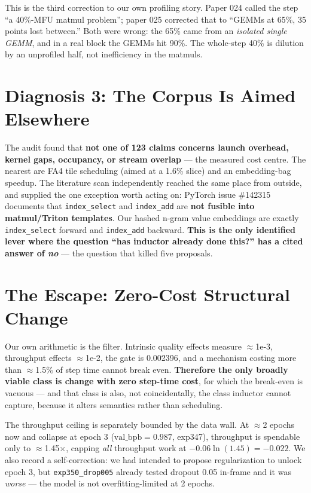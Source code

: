 \documentclass{article}
\newcommand{\vb}{\mathrm{val\_bpb}}
\begin{document}
This is the third correction to our own profiling story. Paper 024 called the step ``a 40\%-MFU matmul problem''; paper 025 corrected that to ``GEMMs at 65\%, 35 points lost between.'' Both were wrong: the 65\% came from an \emph{isolated single GEMM}, and in a real block the GEMMs hit 90\%. The whole-step 40\% is dilution by an unprofiled half, not inefficiency in the matmuls.

\section{Diagnosis 3: The Corpus Is Aimed Elsewhere}
The audit found that \textbf{not one of 123 claims concerns launch overhead, kernel gaps, occupancy, or stream overlap} --- the measured cost centre. The nearest are FA4 tile scheduling (aimed at a 1.6\% slice) and an embedding-bag speedup. The literature scan independently reached the same place from outside, and supplied the one exception worth acting on: PyTorch issue \#142315 documents that \texttt{index\_select} and \texttt{index\_add} are \textbf{not fusible into matmul/Triton templates}. Our hashed n-gram value embeddings are exactly \texttt{index\_select} forward and \texttt{index\_add} backward. \textbf{This is the only identified lever where the question ``has inductor already done this?'' has a cited answer of \emph{no}} --- the question that killed five proposals.

\section{The Escape: Zero-Cost Structural Change}
Our own arithmetic is the filter. Intrinsic quality effects measure $\approx$1e-3, throughput effects $\approx$1e-2, the gate is 0.002396, and a mechanism costing more than $\approx$1.5\% of step time cannot break even. \textbf{Therefore the only broadly viable class is change with zero step-time cost}, for which the break-even is vacuous --- and that class is also, not coincidentally, the class inductor cannot capture, because it alters semantics rather than scheduling.

The throughput ceiling is separately bounded by the data wall. At $\approx$2 epochs now and collapse at epoch 3 ($\vb = 0.987$, exp347), throughput is spendable only to $\approx$1.45$\times$, capping \emph{all} throughput work at $-0.06\ln(1.45) = -0.022$. We also record a self-correction: we had intended to propose regularization to unlock epoch 3, but \texttt{exp350\_drop005} already tested dropout 0.05 in-frame and it was \emph{worse} --- the model is not overfitting-limited at 2 epochs.
\end{document}
